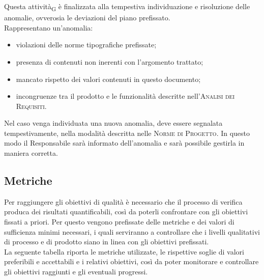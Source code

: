 Questa attività\textsubscript{G} è finalizzata alla tempestiva individuazione e risoluzione delle anomalie, ovverosia le deviazioni del piano prefissato.\\ Rappresentano un'anomalia:
\begin{itemize}
    \item violazioni delle norme tipografiche prefissate;
    \item presenza di contenuti non inerenti con l'argomento trattato;
    \item mancato rispetto dei valori contenuti in questo documento;
    \item incongruenze tra il prodotto e le funzionalità descritte nell'\textsc{Analisi dei Requisiti}.
\end{itemize}
Nel caso venga individuata una nuova anomalia, deve essere segnalata tempestivamente, nella modalità descritta nelle \textsc{Norme di Progetto}. In questo modo il Responsabile sarà informato dell'anomalia e sarà possibile gestirla in maniera corretta.
\pagebreak
\subsection{Metriche}
Per raggiungere gli obiettivi di qualità è necessario che il processo di verifica produca dei risultati quantificabili, così da poterli confrontare con gli obiettivi fissati a priori. Per questo vengono prefissate delle metriche e dei valori di sufficienza minimi necessari, i quali serviranno a controllare che i livelli qualitativi di processo e di prodotto siano in linea con gli obiettivi prefissati.\\La seguente tabella riporta le metriche utilizzate, le rispettive soglie di valori preferibili e accettabili e i relativi obiettivi, così da poter monitorare e controllare gli obiettivi raggiunti e gli eventuali progressi.

